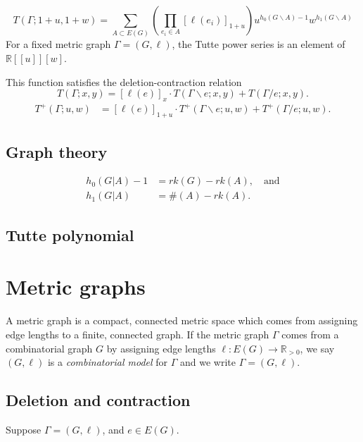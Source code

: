 \documentclass{amsart}
\theoremstyle{definition}
\newcommand{\RR}{\mathbb{R}}
\newcommand{\RRpos}{\RR_{>0}}
\begin{document}
\begin{equation*}
T(\Gamma; 1+u,1+w) = \sum_{A \subset E(G)} \left( \prod_{e_i \in A} [\ell(e_i)]_{1+u} \right)
u^{h_0(G\backslash A) - 1}w^{h_1(G\backslash A)}
\end{equation*}
For a fixed metric graph $\Gamma = (G,\ell)$, the Tutte power series is an element of 
$\RR[[u]][w]$.

This function satisfies the deletion-contraction relation
\begin{equation*}
T(\Gamma; x,y) = [\ell(e)]_x \cdot T(\Gamma \backslash e; x,y) + T(\Gamma / e; x,y) .
\end{equation*}
\begin{align*}
T^+({\Gamma};u,w) &= 
[\ell(e)]_{1+u} \cdot T^+(\Gamma \backslash e; u,w) 
 + T^+(\Gamma / e; u,w) .
\end{align*}

\subsection{Graph theory}
\begin{align*}
h_0(G| A) - 1 &= rk(G) - rk(A), \quad\text{and}\\
h_1(G| A) &= \#(A) - rk(A) .
\end{align*}


\subsection{Tutte polynomial}

\section{Metric graphs}
A metric graph is a compact, connected metric space which comes from 
assigning edge lengths to a finite, connected graph.
If the metric graph $\Gamma$
comes from a combinatorial graph $G$ by 
assigning edge lengths $\ell : E(G) \to \RRpos$,
we say $(G,\ell)$ is a {\em combinatorial model} for $\Gamma$
and we write $\Gamma = (G,\ell)$.

\subsection{Deletion and contraction}

Suppose $\Gamma = (G,\ell)$, and $e \in E(G)$.
\end{document}

